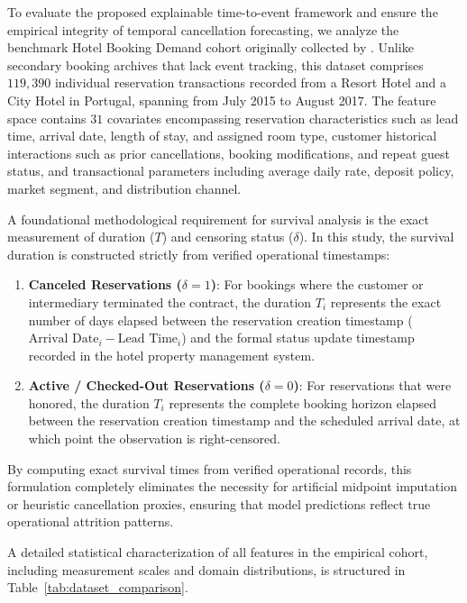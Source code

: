 \documentclass[pdflatex,iicol,sn-mathphys-ay]{sn-jnl}
\theoremstyle{thmstyleone}%
\theoremstyle{thmstyletwo}%
\theoremstyle{thmstylethree}%
\begin{document}
To evaluate the proposed explainable time-to-event framework and ensure the empirical integrity of temporal cancellation forecasting, we analyze the benchmark Hotel Booking Demand cohort originally collected by \cite{antonio2019data}. Unlike secondary booking archives that lack event tracking, this dataset comprises $119{,}390$ individual reservation transactions recorded from a Resort Hotel and a City Hotel in Portugal, spanning from July 2015 to August 2017. The feature space contains $31$ covariates encompassing reservation characteristics such as lead time, arrival date, length of stay, and assigned room type, customer historical interactions such as prior cancellations, booking modifications, and repeat guest status, and transactional parameters including average daily rate, deposit policy, market segment, and distribution channel.

A foundational methodological requirement for survival analysis is the exact measurement of duration ($T$) and censoring status ($\delta$). In this study, the survival duration is constructed strictly from verified operational timestamps:
\begin{enumerate}
  \item \textbf{Canceled Reservations ($\delta = 1$)}: For bookings where the customer or intermediary terminated the contract, the duration $T_i$ represents the exact number of days elapsed between the reservation creation timestamp ($\text{Arrival Date}_i - \text{Lead Time}_i$) and the formal status update timestamp recorded in the hotel property management system.
  \item \textbf{Active / Checked-Out Reservations ($\delta = 0$)}: For reservations that were honored, the duration $T_i$ represents the complete booking horizon elapsed between the reservation creation timestamp and the scheduled arrival date, at which point the observation is right-censored.
\end{enumerate}
By computing exact survival times from verified operational records, this formulation completely eliminates the necessity for artificial midpoint imputation or heuristic cancellation proxies, ensuring that model predictions reflect true operational attrition patterns.

A detailed statistical characterization of all features in the empirical cohort, including measurement scales and domain distributions, is structured in Table~\ref{tab:dataset_comparison}.
\end{document}
